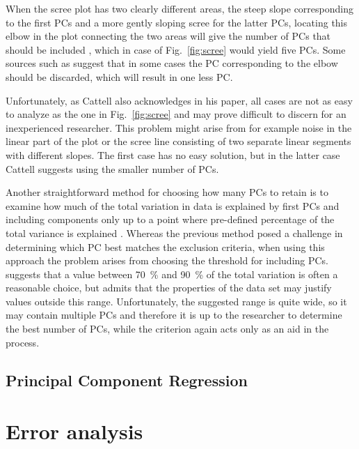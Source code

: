 \documentclass[english, oneside]{HYgradu}
\begin{document}
When the scree plot has two clearly different areas, the steep slope corresponding to the first PCs and a more gently sloping scree for the latter PCs, locating this elbow in the plot connecting the two areas will give the number of PCs that should be included \citep{jolliffe2002principal}, which in case of Fig.\ \ref{fig:scree} would yield five PCs. Some sources such as \citep{cattell1966scree} suggest that in some cases the PC corresponding to the elbow should be discarded, which will result in one less PC.

Unfortunately, as Cattell also acknowledges in his paper, all cases are not as easy to analyze as the one in Fig.\ \ref{fig:scree} and may prove difficult to discern for an inexperienced researcher. This problem might arise from for example noise in the linear part of the plot or the scree line consisting of two separate linear segments with different slopes. The first case has no easy solution, but in the latter case Cattell suggests using the smaller number of PCs.

Another straightforward method for choosing how many PCs to retain is to examine how much of the total variation in data is explained by first PCs and including components only up to a point where pre-defined percentage of the total variance is explained \citep{jolliffe2002principal}. Whereas the previous method posed a challenge in determining which PC best matches the exclusion criteria, when using this approach the problem arises from choosing the threshold for including PCs. \citet{jolliffe2002principal} suggests that a value between 70~\% and 90~\% of the total variation is often a reasonable choice, but admits that the properties of the data set may justify values outside this range. Unfortunately, the suggested range is quite wide, so it may contain multiple PCs and therefore it is up to the researcher to determine the best number of PCs, while the criterion again acts only as an aid in the process. 



\subsection{Principal Component Regression}

\section{Error analysis}
\end{document}
